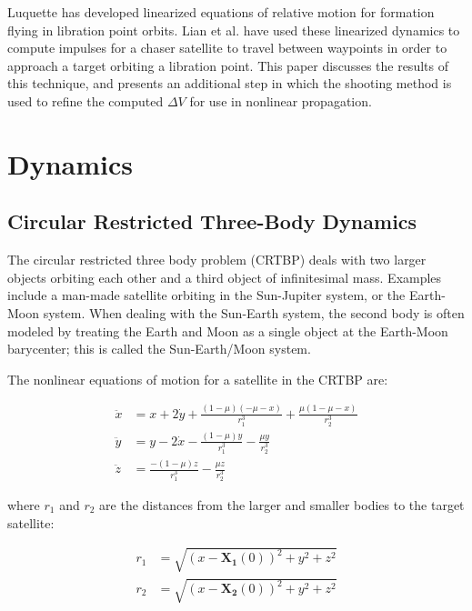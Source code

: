 \documentclass[a4paper]{article}
\begin{document}
Luquette \cite{luquette2004} has developed linearized equations of relative motion for formation flying in libration point orbits.  Lian et al. \cite{lian2011} have used these linearized dynamics to compute impulses for a chaser satellite to travel between waypoints in order to approach a target orbiting a libration point.  This paper discusses the results of this technique, and presents an additional step in which the shooting method is used to refine the computed \(\Delta V\) for use in nonlinear propagation.

\section{Dynamics}

\subsection{Circular Restricted Three-Body Dynamics}
The circular restricted three body problem (CRTBP) deals with two larger objects orbiting each other and a third object of infinitesimal mass.  Examples include a man-made satellite orbiting in the Sun-Jupiter system, or the Earth-Moon system.  When dealing with the Sun-Earth system, the second body is often modeled by treating the Earth and Moon as a single object at the Earth-Moon barycenter; this is called the Sun-Earth/Moon system.

The nonlinear equations of motion for a satellite in the CRTBP are:

\begin{equation} \label{eq:CRTBP}
\begin{aligned}
\ddot{x} &= x + 2\dot{y} + \frac{(1 - \mu)(-\mu - x)}{r_1^3} + \frac{\mu(1 - \mu - x)}{r_2^3} \\
\ddot{y} &= y - 2\dot{x} - \frac{(1 - \mu)y}{r_1^3} - \frac{\mu y}{r_2^3} \\
\ddot{z} &= \frac{-(1 - \mu)z}{r_1^3} - \frac{\mu z}{r_2^3}
\end{aligned}
\end{equation}

where \(r_1\) and \(r_2\) are the distances from the larger and smaller bodies to the target satellite:

\begin{equation*}
\begin{aligned}
r_1 &= \sqrt{(x-\mathbf{X_1}(0))^2 + y^2 + z^2} \\
r_2 &= \sqrt{(x-\mathbf{X_2}(0))^2 + y^2 + z^2}
\end{aligned}
\end{equation*}
\end{document}
